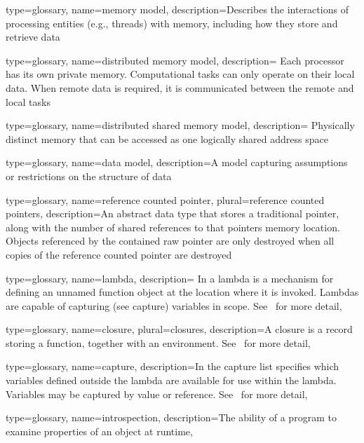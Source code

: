 {
  type=glossary,
  name={memory model},
  description={Describes the interactions of processing entities (e.g.,
      threads) with memory, including how they store and retrieve data}
}

{
  type=glossary,
  name={distributed memory model},
  description={ Each processor has its own private memory. 
     Computational tasks can only operate on their local data. When remote data
     is required, it is communicated between the remote and local tasks}
}

{
  type=glossary,
  name={distributed shared memory model},
  description={ Physically distinct memory that can be accessed as one
    logically shared address space}
}

{
  type=glossary,
  name={data model},
  description={A model capturing assumptions or restrictions on the structure of data}
}


{
  type=glossary,
  name={reference counted pointer},
  plural={reference counted pointers},
  description={An abstract data type that stores a traditional pointer, along
    with the number of shared references to that pointers
    memory location.  Objects referenced by the contained raw pointer are only
     destroyed when all copies of the reference counted pointer are destroyed} 
}

{
  type=glossary,
  name={lambda},
  description={ In \CC{} a lambda is a mechanism for 
    defining an unnamed function object at the location 
    where it is invoked. Lambdas are capable of capturing (see \gls{capture}) variables in
    scope. See~\cite{lambda} for more detail},
}

{
  type={glossary},
  name={closure},
  plural={closures},
  description={A closure is a record storing a function, together with an
    environment.  See~\cite{closure} for more detail},
}

{
  type=glossary,
  name=capture,
  description={In \CC{} the capture list specifies which variables defined
    outside the lambda are available for use within the lambda. Variables may
    be captured by value or reference.  See~\cite{lambda} for more detail},
}

{
  type=glossary,
  name=introspection,
  description={The ability of a program to examine properties of an object at
    runtime},
}

